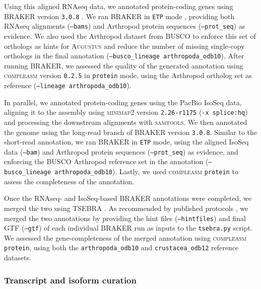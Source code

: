 \documentclass[11pt]{article}
\begin{document}
Using this aligned RNAseq data, we annotated protein-coding genes using \textsc{BRAKER}
version \texttt{3.0.8} \citep{gabriel_braker3_2024}. We ran \textsc{BRAKER} in
\texttt{ETP} mode \citep{bruna_genemark-etp_2024}, providing both RNAseq alignments
(\texttt{--bams}) and Arthropod protein sequences (\texttt{--prot\_seq}) as evidence.
We also used the Arthropod dataset from \textsc{BUSCO} \citep{simao_busco_2015} to
enforce this set of orthologs as hints for \textsc{Augustus} \citep{stanke_using_2008}
and reduce the number of missing single-copy orthologs in the final annotation
(\texttt{--busco\_lineage arthropoda\_odb10}). After running \textsc{BRAKER}, we assessed
the quality of the generated annotation using \textsc{compleasm} version \texttt{0.2.5}
\citep{huang_compleasm_2023} in \texttt{protein} mode, using the Arthropod ortholog set
as reference (\texttt{--lineage arthropoda\_odb10}).
\vspace{0.2cm}

In parallel, we annotated protein-coding genes using the PacBio IsoSeq data, aligning it
to the assembly using \textsc{minimap2} version \texttt{2.26-r1175} (\texttt{-x splice:hq})
and processing the downstream alignments with \textsc{samtools}. We then annotated the
genome using the long-read branch of \textsc{BRAKER} version \texttt{3.0.8}. Similar to
the short-read annotation, we ran \textsc{BRAKER} in \texttt{ETP} mode, using the aligned
IsoSeq data (\texttt{--bam}) and Arthropod protein sequences (\texttt{--prot\_seq}) as
evidence, and enforcing the \textsc{BUSCO} Arthropod reference set in the annotation
(\texttt{--busco\_lineage arthropoda\_odb10}). Lastly, we used \textsc{compleasm}
\texttt{protein} to assess the completeness of the annotation.
\vspace{0.2cm}

Once the RNAseq- and IsoSeq-based \textsc{BRAKER} annotations were completed, we merged
the two using \textsc{TSEBRA} \citep{gabriel_tsebra_2021}. As recommended by published
protocols \citep{bonizzoni_navigating_2025}, we merged the two annotations by providing
the hint files (\texttt{--hintfiles}) and final GTF (\texttt{--gtf}) of each
individual \textsc{BRAKER} run as inputs to the \texttt{tsebra.py} script. We assessed
the gene-completeness of the merged annotation using \textsc{compleasm} \texttt{protein},
using both the \texttt{arthropoda\_odb10} and \texttt{crustacea\_odb12} reference datasets.

\subsubsection*{Transcript and isoform curation}
\end{document}
